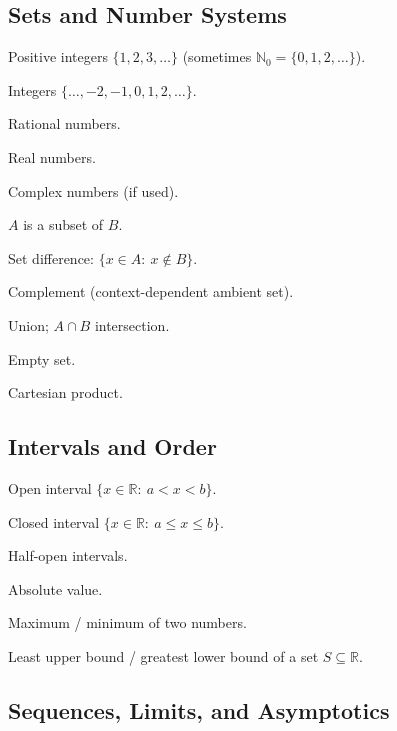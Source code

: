 \documentclass[12pt]{article}
\numberwithin{equation}{section}
\newcommand{\RR}{\mathbb{R}}
\newcommand{\CC}{\mathbb{C}}
\newcommand{\QQ}{\mathbb{Q}}
\newcommand{\ZZ}{\mathbb{Z}}
\newcommand{\NN}{\mathbb{N}}
\let\emptyset\varnothing
\theoremstyle{plain}
\theoremstyle{definition}
\theoremstyle{remark}
\begin{document}
\subsection{Sets and Number Systems}

\begin{description}[leftmargin=3.2cm,labelsep=0.6cm]
\item[$\NN$] Positive integers $\{1,2,3,\dots\}$ (sometimes $\NN_0=\{0,1,2,\dots\}$).
\item[$\ZZ$] Integers $\{\dots,-2,-1,0,1,2,\dots\}$.
\item[$\QQ$] Rational numbers.
\item[$\RR$] Real numbers.
\item[$\CC$] Complex numbers (if used).
\item[$A\subseteq B$] $A$ is a subset of $B$.
\item[$A\setminus B$] Set difference: $\{x\in A:\ x\notin B\}$.
\item[$A^c$] Complement (context-dependent ambient set).
\item[$A\cup B$] Union; $A\cap B$ intersection.
\item[$\emptyset$] Empty set.
\item[$\times$] Cartesian product.
\end{description}

\subsection{Intervals and Order}

\begin{description}[leftmargin=3.2cm,labelsep=0.6cm]
\item[$(a,b)$] Open interval $\{x\in\RR:\ a<x<b\}$.
\item[{$[a,b]$}] Closed interval $\{x\in\RR:\ a\le x\le b\}$.
\item[{$(a,b]$ or $[a,b)$}] Half-open intervals.
\item[{$|x|$}] Absolute value.
\item[$\max\{a,b\}$, $\min\{a,b\}$] Maximum / minimum of two numbers.
\item[$\sup S$, $\inf S$] Least upper bound / greatest lower bound of a set $S\subseteq\RR$.
\end{description}

\subsection{Sequences, Limits, and Asymptotics}
\end{document}
